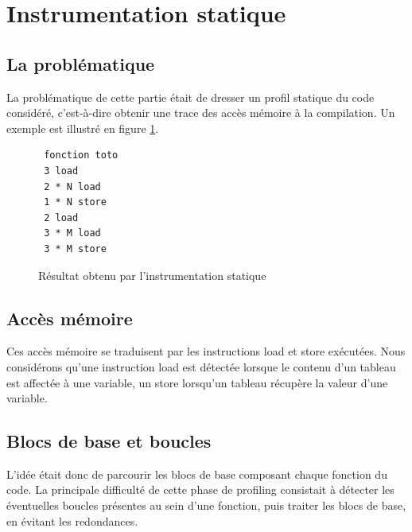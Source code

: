 %

\section{Instrumentation statique}

\subsection{La problématique}

La problématique de cette partie était de dresser un profil statique du code considéré, c'est-à-dire obtenir une trace des accès mémoire à la compilation. Un exemple est illustré en figure \ref{fig:static_result}.

\begin{figure}[here]
  \centering
\begin{verbatim}
 fonction toto
 3 load
 2 * N load
 1 * N store
 2 load
 3 * M load
 3 * M store
\end{verbatim}
  \caption{Résultat obtenu par l'instrumentation statique}
  \label{fig:static_result}
\end{figure}

\subsection{Accès mémoire}

Ces accès mémoire se traduisent par les instructions load et store exécutées. Nous considérons qu'une instruction load est détectée lorsque le contenu d'un tableau est affectée à une variable, un store lorsqu'un tableau récupère la valeur d'une variable.\\

\subsection{Blocs de base et boucles}

L'idée était donc de parcourir les blocs de base composant chaque fonction du code. La principale difficulté de cette phase de profiling consistait à détecter les éventuelles boucles présentes au sein d'une fonction, puis traiter les blocs de base, en évitant les redondances.

